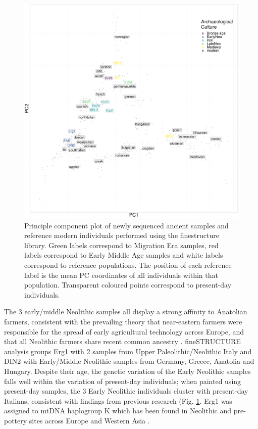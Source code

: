 \begin{figure}[htp]
    \centering
    \includegraphics[width=1.0\textwidth]{../images/chapter4/chunklengths_moderns_ancients_PCA.pdf}
    \caption{Principle component plot of newly sequenced ancient samples and reference modern individuals performed using the finestructure library. Green labels correspond to Migration Era samples, red labels correspond to Early Middle Age samples and white labels correspond to reference populations. The position of each reference label is the mean PC coordinates of all individuals within that population. Transparent coloured points correspond to present-day individuals.}
    \label{fig:chunklengths_moderns_ancients_PCA_bav}
\end{figure}

The 3 early/middle Neolithic samples all display a strong affinity to Anatolian farmers, consistent with the prevailing theory that near-eastern farmers were responsible for the spread of early agricultural technology across Europe, and that all Neolithic farmers share recent common ancestry \cite{Haak2010, haak2005ancient, bramanti2009genetic, Lazaridis2014}. fineSTRUCTURE analysis groups Erg1 with 2 samples from Upper Paleolithic/Neolithic Italy and DIN2 with Early/Middle Neolithic samples from Germany, Greece, Anatolia and Hungary. Despite their age, the genetic variation of the Early Neolithic samples falls well within the variation of present-day individuals; when painted using present-day samples, the 3 Early Neolithic individuals cluster with present-day Italians, consistent with findings from previous research \cite{Lazaridis2014, Haak2015} (Fig. \ref{fig:chunklengths_moderns_ancients_PCA_bav}. Erg1 was assigned to mtDNA haplogroup K which has been found in Neolithic and pre-pottery sites across Europe \cite{Hofmanova2016, fernandez2014ancient} and Western Asia \cite{Lazaridis2016, Mathieson2015}. 


